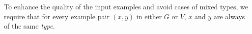 To enhance the quality of the input examples and avoid cases of mixed types, 
we require that for every example pair $(x,y)$ in either $G$ or $V$, $x$ and $y$ are always of the same \emph{type}. 



